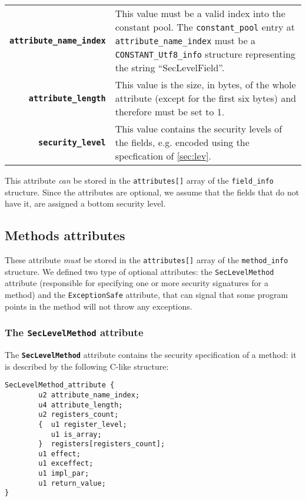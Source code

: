 \documentclass [a4paper,twoside]{article}
\begin{document}
\begin{tabular}{rp{220pt}}
\textbf{\texttt{attribute\_name\_index}}& 
This value must be a valid index into the constant pool. The
\verb+constant_pool+ entry at \verb+attribute_name_index+ must be a
\verb+CONSTANT_Utf8_info+ structure representing the string
``SecLevelField''. \\
\textbf{\texttt{attribute\_length}}&
This value is the size, in bytes, of the whole attribute (except for the first six bytes) and therefore must be set to 1.\\
\textbf{\texttt{security\_level}}& This value contains the security levels of the fields, e.g. encoded using the specfication of \ref{sec:lev}. 
\end{tabular}

This attribute \textit{can} be stored in the \verb+attributes[]+ array
of the \verb+field_info+ structure.  Since the attributes are
optional, we assume that the fields that do not have it, are assigned
a bottom security level.

\subsection{Methods attributes}
These attribute \emph{must} be stored in the \verb+attributes[]+ array
of the \verb+method_info+ structure. We defined two type of optional
attributes: the \texttt{SecLevelMethod} attribute (responsible for
specifying one or more security signatures for a method) and the
\texttt{ExceptionSafe} attribute, that can signal that some program
points in the method will not throw any exceptions.

\subsubsection{The \texttt{SecLevelMethod} attribute}

The \textbf{\texttt{SecLevelMethod}} attribute contains the security
specification of a method: it is described by the following C-like
structure:
\begin{lstlisting}[frame=tb]
SecLevelMethod_attribute {
        u2 attribute_name_index;
        u4 attribute_length;
        u2 registers_count; 
        {  u1 register_level;
           u1 is_array;
        }  registers[registers_count];
        u1 effect;
        u1 exceffect;
        u1 impl_par;
        u1 return_value;
}
\end{lstlisting}
\end{document}
